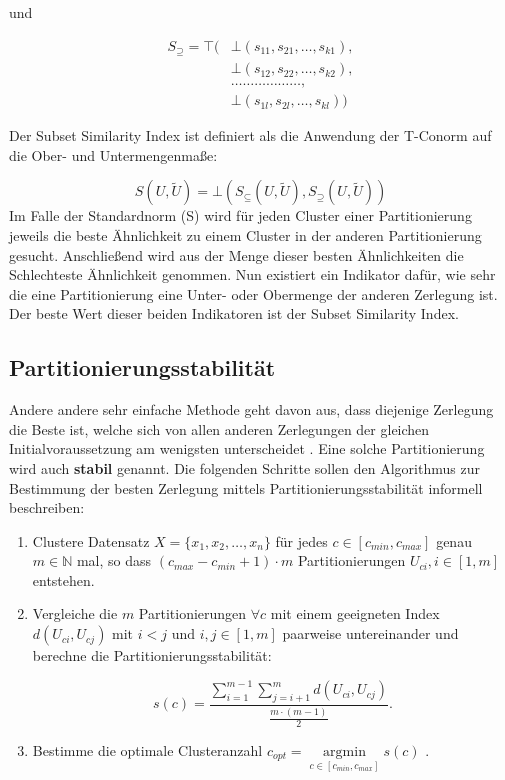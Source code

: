 \documentclass[11pt,ceqn]{book}
\DeclareMathOperator*{\argmin}{argmin}
\begin{document}
und 


\begin{align*}
S_{\supseteq} = \top( 
&\bot(s_{11},s_{21}, \dots, s_{k1}), \\
&\bot(s_{12}, s_{22}, \dots, s_{k2}),\\ 
&\dots\dots\dots\dots\dots\dots,\\ 
&\bot(s_{1l}, s_{2l}, \dots, s_{kl})
)
\end{align*}

Der Subset Similarity Index ist definiert als die Anwendung der T-Conorm auf die Ober- und Untermengenmaße:

$$S(U,\tilde{U}) = \bot(S_{\subseteq}(U,\tilde{U}),S_{\supseteq}(U,\tilde{U}))$$
Im Falle der Standardnorm (S) wird für jeden Cluster einer Partitionierung jeweils die beste Ähnlichkeit zu einem Cluster in der anderen Partitionierung gesucht. Anschließend wird aus der Menge dieser besten Ähnlichkeiten die Schlechteste Ähnlichkeit genommen. Nun existiert ein Indikator dafür, wie sehr die eine Partitionierung eine Unter- oder Obermenge der anderen Zerlegung ist. Der beste Wert dieser beiden Indikatoren ist der Subset Similarity Index.

\subsection{Partitionierungsstabilität}

Andere andere sehr einfache Methode geht davon aus, dass diejenige Zerlegung die Beste ist, welche sich von allen anderen Zerlegungen der gleichen Initialvoraussetzung am wenigsten unterscheidet \cite{partstab}. Eine solche Partitionierung wird auch \textbf{stabil} genannt. Die folgenden Schritte sollen den Algorithmus zur Bestimmung der besten Zerlegung mittels Partitionierungsstabilität informell beschreiben:

\begin{enumerate}
\item Clustere Datensatz $X=\{x_1, x_2, \dots, x_n\}$ für jedes $c \in \left[c_{min},c_{max}\right]$ genau $m \in \mathbb{N}$ mal, so dass $(c_{max}-c_{min}+1)\cdot m$ Partitionierungen $U_{ci}, i\in \left[1,m\right]$ entstehen.
\item Vergleiche die $m$ Partitionierungen $\forall c$ mit einem geeigneten Index $d(U_{ci},U_{cj}) \text{ mit } i<j \text{ und } i,j \in \left[1,m\right]$ paarweise untereinander und berechne die Partitionierungsstabilität:

$$s(c)=\frac{\sum\limits_{i=1}^{m-1}\sum\limits_{j=i+1}^m d(U_{ci},U_{cj})}{\frac{m \cdot (m-1)}{2}}.$$
\item Bestimme die optimale Clusteranzahl $c_{opt} = \argmin \limits_{c\in \left[c_{min},c_{max}\right]} s(c)$ .

\end{enumerate}
\end{document}
